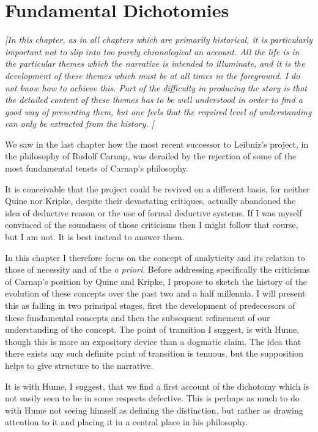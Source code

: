 \chapter{Fundamental Dichotomies}\label{FundamentalDichotomies}

\emph{[In this chapter, as in all chapters which are primarily
    historical, it is particularly important not to slip into too
    purely chronological an account. 
All the life is in the particular themes which the narrative is
intended to illuminate, and it is the development of these
themes which must be at all times in the foreground. 
I do not know how to achieve this.
Part of the difficulty in producing the story is that the detailed
content of these themes has to be well understood in order to find a
good way of presenting them, but one feels that the required level of
understanding can only be extracted from the history. 
]}

We saw in the last chapter how the most recent successor to
Leibniz's project, in the philosophy of Rudolf
Carnap, was derailed by the rejection of some of
the most fundamental tenets of Carnap's philosophy. 

It is conceivable that the project could be revived on a different
basis, for neither Quine nor Kripke, despite their devastating
critiques, actually abandoned the idea of deductive reason or the use
of formal deductive systems.
If I was myself convinced of the soundness of those criticisms then I
might follow that course, but I am not.
It is best instead to answer them.

In this chapter I therefore focus on the concept of analyticity and
its relation to those of necessity and of the \emph{a priori}.
Before addressing specifically the criticisms of Carnap's position by
Quine and Kripke, I propose to sketch the history of the evolution of
these concepts over the past two and a half millennia.
I will present this as falling in two principal stages, first the
development of predecessors of these fundamental concepts and then the
subsequent refinement of our understanding of the concept. 
The point of transition I suggest, is with Hume, though this is more
an expository device than a dogmatic claim.
The idea that there exists any such definite point of transition is
tenuous, but the supposition helps to give structure to the narrative.

It is with Hume, I suggest, that we find a first account of the
dichotomy which is not easily seen to be in some respects defective. 
This is perhaps as much to do with Hume not seeing himself as defining
the distinction, but rather as drawing attention to it and placing it
in a central place in his philosophy. 

